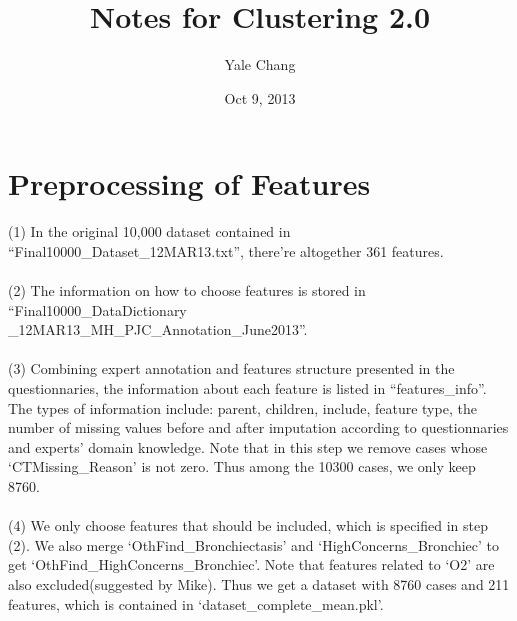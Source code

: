 \documentclass[11pt]{article}
\title{\textbf{Notes for Clustering 2.0}}
\author{Yale Chang}
\date{Oct 9, 2013}
\begin{document}
\maketitle

\section{Preprocessing of Features}
(1) In the original 10,000 dataset contained in ``Final10000\_Dataset\_12MAR13.txt'', there're altogether 361 features.\\
\\ 
(2) The information on how to choose features is stored in ``Final10000\_DataDictionary\\\_12MAR13\_MH\_PJC\_Annotation\_June2013''. \\
\\
(3) Combining expert annotation and features structure presented in the questionnaries, the information about each feature is listed in ``features\_info''. The types of information include: parent, children, include, feature type, the number of missing values before and after imputation according to questionnaries and experts' domain knowledge. Note that in this step we remove cases whose `CTMissing\_Reason' is not zero. Thus among the 10300 cases, we only keep 8760. \\
\\
(4) We only choose features that should be included, which is specified in step (2). We also merge `OthFind\_Bronchiectasis' and `HighConcerns\_Bronchiec' to get `OthFind\_HighConcerns\_Bronchiec'. Note that features related to `O2' are also excluded(suggested by Mike). Thus we get a dataset with 8760 cases and 211 features, which is contained in `dataset\_complete\_mean.pkl'. \\
\\
\end{document}
